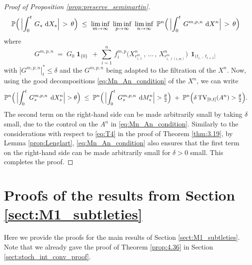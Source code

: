 \documentclass[11pt]{article}
\theoremstyle{definition}\newtheorem{example}[theorem]{Example}
\theoremstyle{definition}\newtheorem{counterexample}[theorem]{Counterexample}
\theoremstyle{definition}\newtheorem{remark}[theorem]{Remark}
\theoremstyle{definition}\newtheorem{defi}[theorem]{Definition}
\numberwithin{equation}{section}
\newcommand*\diff{\mathop{}\!\mathrm{d}}								%
\newcommand{\Pro}{\mathbb{P}}										%
\newcommand{\ind}{\operatorname{\mathbf{1}}}							%
\renewcommand{\|}{\; : \, \;}											%
\begin{document}
\begin{proof}[Proof of Proposition \ref{prop:preserve_semimartin}]
	\[
	\Pro \Bigl(\, \Bigl|\int_{0}^{t}\, G_s \, \diff X_s \Bigr|\, >\, \theta\Bigr) \; \leq \; \liminf_{m\rightarrow\infty}\;  \liminf_{p \to \infty}\; \liminf_{n\rightarrow\infty}\; \Pro^n\Bigl(\, \Bigl|\int_{0}^{t}\, G^{m,p,n}\, \diff X^{n}\Bigr|\, >\, \theta \Bigr)
	\]
	where 
	\[
	G^{m,p,n}\; = \; G_{0}\ind_{\{0\}}\, + \,\sum_{i=1}^{n}\, f_{i}^{m,p}\bigl(X^n_{r^m_{i,\, 1}}\, , \, \ldots \, , \, X^n_{r_{ i,\,\ell(i,m)}^m}\bigr)\, \ind_{(t_{i,}\, ,\, t_{i+1}]}
	\]
	with $| G^{m,p,n}|^*_t\leq \delta$ and the $G^{m,p,n}$ being adapted to the filtration of the $X^n$.
	Now, using the good decompositions \eqref{eq:Mn_An_condition} of the $X^n$, we can write
	\[
	\mathbb{{P}}^n\Bigl( \, \Bigl|\int_{0}^{t}\, G^{m,p,n}_s\; \diff X^{n}_s\Bigr| > \theta\Bigr) \; \leq \; \mathbb{{P}}^n\Bigl(\, \Bigl|\int_{0}^{t}\, G^{m,p,n}_s\; \diff M^{n}_s\Bigr| > \tfrac{\theta}{2} \Bigr)\; + \; \mathbb{{P}}^n\Bigl(\delta\, \text{TV}_{[0,t]}(A^{n})>  \tfrac{\theta}{2} \Bigr).
	\]
	The second term on the right-hand side can be made arbitrarily small by taking $\delta$ small, due to the control on the $A^n$ in \eqref{eq:Mn_An_condition}. Similarly to the considerations with respect to \eqref{eq:T4} in the proof of Theorem \ref{thm:3.19}, by Lemma \ref{prop:Lenglart}, \eqref{eq:Mn_An_condition} also ensures that the first term on the right-hand side can be made arbitrarily small for $\delta>0$ small. This completes the proof.
\end{proof}




\section{Proofs of the results from Section \ref{sect:M1_subtleties}}\label{sect:proofs_sect4}
Here we provide the proofs for the main results of Section \ref{sect:M1_subtleties}. Note that we already gave the proof of Theorem \ref{prop:4.36} in Section \ref{sect:stoch_int_conv_proof}.

\end{document}
